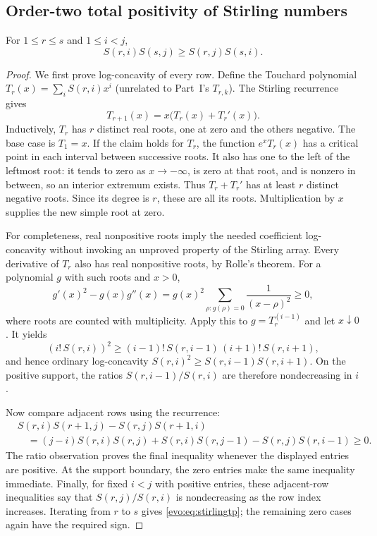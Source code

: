 \documentclass[11pt,a4paper]{article}
\numberwithin{equation}{section}
\theoremstyle{definition}
\theoremstyle{remark}
\begin{document}
\subsection{Order-two total positivity of Stirling numbers}

\begin{lemma}[Manuscript~06]\label{evo:lem:stirlingtp}
For $1\le r\le s$ and $1\le i<j$,
\begin{equation}\label{evo:eq:stirlingtp}
 S(r,i)S(s,j)\ge S(r,j)S(s,i).
\end{equation}
\end{lemma}
\begin{proof}
We first prove log-concavity of every row. Define the Touchard polynomial
$T_r(x)=\sum_iS(r,i)x^i$ (unrelated to Part~I's $T_{r,k}$). The Stirling
recurrence gives
\[
 T_{r+1}(x)=x\bigl(T_r(x)+T_r'(x)\bigr).
\]
Inductively, $T_r$ has $r$ distinct real roots, one at zero and the others
negative. The base case is $T_1=x$. If the claim holds for $T_r$, the function
$e^xT_r(x)$ has a critical point in each interval between successive roots.
It also has one to the left of the leftmost root: it tends to zero as
$x\to-\infty$, is zero at that root, and is nonzero in between, so an interior
extremum exists. Thus $T_r+T_r'$ has at least $r$ distinct negative roots.
Since its degree is $r$, these are all its roots. Multiplication by $x$
supplies the new simple root at zero.

For completeness, real nonpositive roots imply the needed coefficient
log-concavity without invoking an unproved property of the Stirling array.
Every derivative of $T_r$ also has real nonpositive roots, by Rolle's
theorem. For a polynomial $g$ with such roots and $x>0$,
\[
 g'(x)^2-g(x)g''(x)
   =g(x)^2\sum_{\rho:g(\rho)=0}\frac1{(x-\rho)^2}\ge0,
\]
where roots are counted with multiplicity. Apply this to $g=T_r^{(i-1)}$ and
let $x\downarrow0$. It yields
\[
 (i!\,S(r,i))^2\ge (i-1)!\,S(r,i-1)\,(i+1)!\,S(r,i+1),
\]
and hence ordinary log-concavity $S(r,i)^2\ge S(r,i-1)S(r,i+1)$. On the
positive support, the ratios $S(r,i-1)/S(r,i)$ are therefore nondecreasing in
$i$.

Now compare adjacent rows using the recurrence:
\begin{align*}
&S(r,i)S(r+1,j)-S(r,j)S(r+1,i)\\
&\quad=(j-i)S(r,i)S(r,j)
 +S(r,i)S(r,j-1)-S(r,j)S(r,i-1)\ge0.
\end{align*}
The ratio observation proves the final inequality whenever the displayed
entries are positive. At the support boundary, the zero entries make the same
inequality immediate. Finally, for fixed $i<j$ with positive entries, these
adjacent-row inequalities say that $S(r,j)/S(r,i)$ is nondecreasing as the row
index increases. Iterating from $r$ to $s$ gives \eqref{evo:eq:stirlingtp};
the remaining zero cases again have the required sign.
\end{proof}
\end{document}
